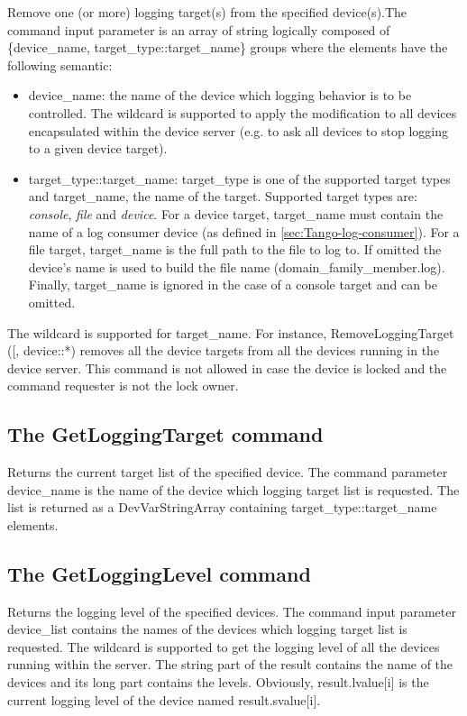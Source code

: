 Remove one (or more) logging target(s) from the specified device(s).The
command input parameter is an array of string logically composed of
\{device\_name, target\_type::target\_name\} groups where the elements
have the following semantic:
\begin{itemize}
\item device\_name: the name of the device which logging behavior is to
be controlled. The wildcard \textquotedbl{}{*}\textquotedbl{} is supported
to apply the modification to all devices encapsulated within the device
server (e.g. to ask all devices to stop logging to a given device
target).
\item target\_type::target\_name: target\_type is one of the supported target
types and target\_name, the name of the target. Supported target types
are: \emph{console}, \emph{file} and \emph{device}. For a device target,
target\_name must contain the name of a log consumer device (as defined
in \ref{sec:Tango-log-consumer}). For a file target, target\_name
is the full path to the file to log to. If omitted the device's name
is used to build the file name (domain\_family\_member.log). Finally,
target\_name is ignored in the case of a console target and can be
omitted.
\end{itemize}
The wildcard \textquotedbl{}{*}\textquotedbl{} is supported for target\_name.
For instance, RemoveLoggingTarget ({[}\textquotedbl{}{*}\textquotedbl{},
\textquotedbl{}device::{*}\textquotedbl{}{]}) removes all the device
targets from all the devices running in the device server. This command
is not allowed in case the device is locked and the command requester
is not the lock owner.

\subsection{The GetLoggingTarget command}

Returns the current target list of the specified device. The command
parameter device\_name is the name of the device which logging target
list is requested. The list is returned as a DevVarStringArray containing
target\_type::target\_name elements.

\subsection{The GetLoggingLevel command}

Returns the logging level of the specified devices. The command input
parameter device\_list contains the names of the devices which logging
target list is requested. The wildcard \textquotedbl{}{*}\textquotedbl{}
is supported to get the logging level of all the devices running within
the server. The string part of the result contains the name of the
devices and its long part contains the levels. Obviously, result.lvalue{[}i{]}
is the current logging level of the device named result.svalue{[}i{]}.

